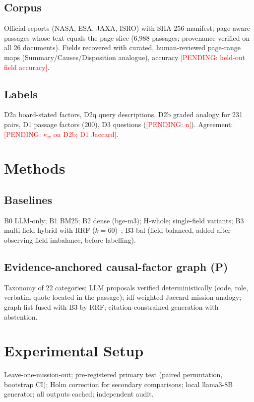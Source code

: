 \documentclass[conference]{IEEEtran}
\newcommand{\PENDING}[1]{\textcolor{red}{[PENDING: #1]}}
\begin{document}
\subsection{Corpus}
Official reports (NASA, ESA, JAXA, ISRO) with SHA-256 manifest; page-aware passages whose text equals the page
slice (6,988 passages; provenance verified on all 26 documents). Fields recovered with curated, human-reviewed
page-range maps (Summary/Causes/Disposition analogue), accuracy \PENDING{held-out field accuracy}.
\subsection{Labels}
D2a board-stated factors, D2q query descriptions, D2b graded analogy for 231 pairs, D1 passage factors (200),
D3 questions (\PENDING{n}). Agreement: \PENDING{$\kappa_w$ on D2b; D1 Jaccard}.

\section{Methods}
\subsection{Baselines}
B0 LLM-only; B1 BM25; B2 dense (bge-m3); H-whole; single-field variants; B3 multi-field hybrid with RRF
($k=60$)~\cite{kim2026}; B3-bal (field-balanced, added after observing field imbalance, before labelling).
\subsection{Evidence-anchored causal-factor graph (P)}
Taxonomy of 22 categories; LLM proposals verified deterministically (code, role, verbatim quote located in the
passage); idf-weighted Jaccard mission analogy; graph list fused with B3 by RRF; citation-constrained
generation with abstention.

\section{Experimental Setup}
Leave-one-mission-out; pre-registered primary test (paired permutation, bootstrap CI); Holm correction for
secondary comparisons; local llama3-8B generator; all outputs cached; independent audit.
\end{document}
